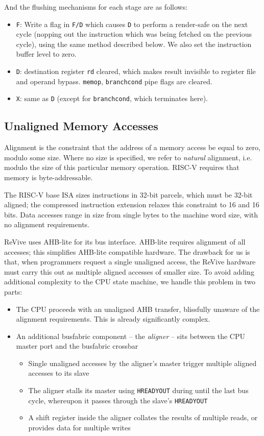 \documentclass{article}
\begin{document}
And the flushing mechanisms for each stage are as follows:
\begin{itemize}
	\item \texttt{F}: Write a flag in \texttt{F/D} which causes \texttt{D} to perform a render-safe on the next cycle (nopping out the instruction which was being fetched on the previous cycle), using the same method described below. We also set the instruction buffer level to zero.
	\item \texttt{D}: destination register \texttt{rd} cleared, which makes result invisible to register file and operand bypass. \texttt{memop}, \texttt{branchcond} pipe flags are cleared.
	\item \texttt{X}: same as \texttt{D} (except for \texttt{branchcond}, which terminates here).
\end{itemize}

\subsection{Unaligned Memory Accesses}

Alignment is the constraint that the address of a memory access be equal to zero, modulo some size. Where no size is specified, we refer to \textit{natural} alignment, i.e. modulo the size of this particular memory operation. RISC-V requires that memory is byte-addressable.

The RISC-V base ISA sizes instructions in 32-bit parcels, which must be 32-bit aligned; the compressed instruction extension relaxes this constraint to 16 and 16 bits. Data accesses range in size from single bytes to the machine word size, with no alignment requirements. 

ReVive uses AHB-lite for its bus interface. AHB-lite requires alignment of all accesses; this simplifies AHB-lite compatible hardware. The drawback for us is that, when programmers request a single unaligned access, the ReVive hardware must carry this out as multiple aligned accesses of smaller size. To avoid adding additional complexity to the CPU state machine, we handle this problem in two parts:

\begin{itemize}
	\item The CPU proceeds with an unaligned AHB transfer, blissfully unaware of the alignment requirements. This is already significantly complex.
	\item An additional busfabric component -- the \textit{aligner} -- sits between the CPU master port and the busfabric crossbar
	\begin{itemize}
		\item Single unaligned accesses by the aligner's master trigger multiple aligned accesses to its slave
		\item The aligner stalls its master using \texttt{HREADYOUT} during until the last bus cycle, whereupon it passes through the slave's \texttt{HREADYOUT}
		\item A shift register inside the aligner collates the results of multiple reads, or provides data for multiple writes
	\end{itemize}
\end{itemize}
\end{document}
